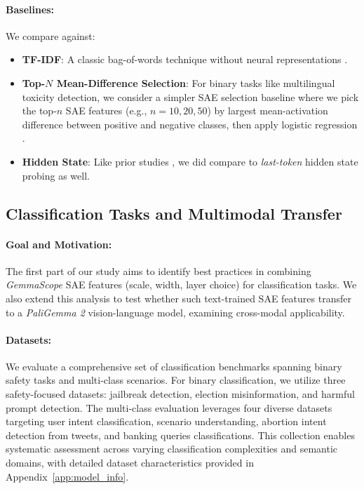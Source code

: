 \paragraph{Baselines:}
We compare against:
\begin{itemize}
    \item \textbf{TF-IDF}: A classic bag-of-words technique without neural representations \cite{sparck_jones_1972}.
    \item \textbf{Top-$N$ Mean-Difference Selection}: For binary tasks like multilingual toxicity detection, we consider a simpler SAE selection baseline where we pick the top-$n$ SAE features (e.g., $n=10,20,50$) by largest mean-activation difference between positive and negative classes, then apply logistic regression \cite{sae_probing}.
    \item \textbf{Hidden State}: Like prior studies \cite{features_as_classifiers}, we did compare to \emph{last-token} hidden state probing as well. 
\end{itemize}

\subsection{Classification Tasks and Multimodal Transfer }
\label{sec:part1}

\paragraph{Goal and Motivation:}
The first part of our study aims to identify best practices in combining \emph{GemmaScope} SAE features (scale, width, layer choice) for classification tasks. We also extend this analysis to test whether such text-trained SAE features transfer to a \emph{PaliGemma 2} vision-language model, examining cross-modal applicability.

\paragraph{Datasets:}
We evaluate a comprehensive set of classification benchmarks spanning binary safety tasks and multi-class scenarios. For binary classification, we utilize three safety-focused datasets: jailbreak detection, election misinformation, and harmful prompt detection. The multi-class evaluation leverages four diverse datasets targeting user intent classification, scenario understanding, abortion intent detection from tweets, and banking queries classifications. This collection enables systematic assessment across varying classification complexities and semantic domains, with detailed dataset characteristics provided in Appendix~\ref{app:model_info}.

